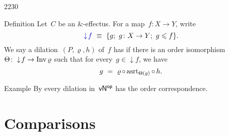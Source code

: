 \begin{parsec}{2230}
\begin{point}{50}{Definition}%
Let~$C$ be an $\&$-effectus.
For a map~$f\colon X \to Y$,
    write
\begin{equation*}
    \Define{\downarrow\!f} \ \equiv \ 
    \{ g; \ g\colon X \to Y; \ g \leq f \}.
\end{equation*}
    We say a dilation~$(P, \varrho, h)$ of~$f$
        has  if
        there is an order isomorphism~$\Theta\colon \downarrow\!f \to \operatorname{Inv} \varrho$
        such that for every~$g \in \downarrow\!f$,
        we have
\begin{equation*}
g \ =\  \varrho \mathop{\circ} \mathrm{asrt}_{\Theta(g)} \mathop{\circ} h.
\end{equation*}
\end{point}
\begin{point}{60}{Example}%
By 
    every dilation in~${\mathsf{vN}}{^{\mathsf{op}}}$
    has the order correspondence.
\end{point}
\end{parsec}

\section{Comparisons}
